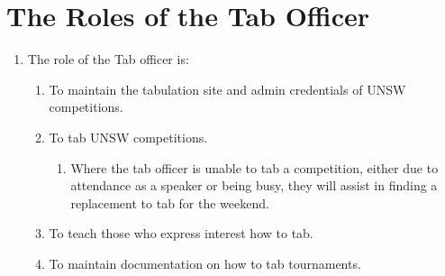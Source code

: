 \newpage
\section{The Roles of the Tab Officer}

\begin{enumerate}
\item The role of the Tab officer is:
  \begin{enumerate}
  \item To maintain the tabulation site and admin credentials of UNSW competitions.
  \item To tab UNSW competitions.
  \begin{enumerate}
    \item Where the tab officer is unable to tab a competition, either due to attendance as a speaker or being busy, they will assist in finding a replacement to tab for the weekend.
  \end{enumerate}
  \item To teach those who express interest how to tab.
  \item To maintain documentation on how to tab tournaments.
  \end{enumerate}
\end{enumerate}

